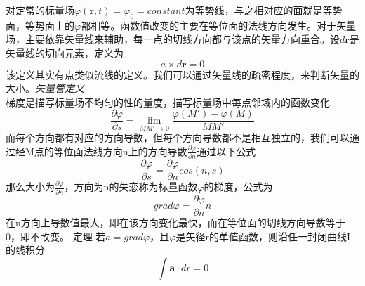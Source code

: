 \documentclass[a4paper]{report}
\begin{document}
 对定常的标量场$\varphi(\textbf{r},t)=\varphi_0=constant$为等势线，与之相对应的面就是等势面，等势面上的$\varphi$都相等。函数值改变的主要在等位面的法线方向发生。对于矢量场，主要依靠矢量线来辅助，每一点的切线方向都与该点的矢量方向重合。设$d\textbf{r}$是矢量线的切向元素，定义为
\begin{equation}
     a\times d\textbf{r} =0
\end{equation}
该定义其实有点类似流线的定义。我们可以通过矢量线的疏密程度，来判断矢量的大小。\textit{矢量管定义}\\
梯度是描写标量场不均匀的性的量度，描写标量场中每点邻域内的函数变化
\begin{equation}
	\frac{\partial\varphi}{\partial s}=\lim_{MM' \to 0}\frac{\varphi(M')-\varphi(M)}{MM'}
\end{equation}而每个方向都有对应的方向导数，但每个方向导数都不是相互独立的，我们可以通过经M点的等位面法线方向n上的方向导数$\frac{\partial \varphi}{\partial n}$通过以下公式
\begin{equation}
	\frac{\partial \varphi}{\partial s}=\frac{\partial \varphi}{\partial n}cos(n,s)
\end{equation}
那么大小为$\frac{\partial \varphi}{\partial n}$，方向为n的失恋称为标量函数$\varphi$的梯度，公式为
\begin{equation}
      grad \varphi=\frac{\partial \varphi}{\partial n} {n} 
\end{equation}
在n方向上导数值最大，即在该方向变化最快，而在等位面的切线方向导数等于0，即不改变。
  定理 若$a=grad\varphi$，且$\varphi$是矢径r的单值函数，则沿任一封闭曲线L的线积分
 \begin{equation*}
 \int \textbf{a}\cdot dr=0
 \end{equation*}
\end{document}
